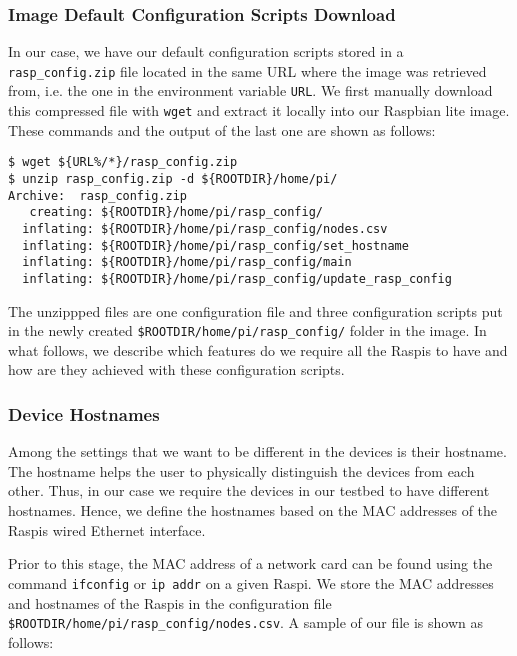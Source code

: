 \subsubsection{Image Default Configuration Scripts Download}
\label{sec:configuration_files_download}
In our case, we have our default configuration scripts stored in a
\texttt{rasp\_config.zip} file located in the same \ac{URL} where the image
was retrieved from, i.e. the one in the environment variable \texttt{URL}.
We first manually download this compressed file with \texttt{wget} and
extract it locally into our Raspbian lite image. These commands and the
output of the last one are shown as follows:

\begin{lstlisting}[]
$ wget ${URL%/*}/rasp_config.zip
$ unzip rasp_config.zip -d ${ROOTDIR}/home/pi/
Archive:  rasp_config.zip
   creating: ${ROOTDIR}/home/pi/rasp_config/
  inflating: ${ROOTDIR}/home/pi/rasp_config/nodes.csv
  inflating: ${ROOTDIR}/home/pi/rasp_config/set_hostname
  inflating: ${ROOTDIR}/home/pi/rasp_config/main
  inflating: ${ROOTDIR}/home/pi/rasp_config/update_rasp_config
\end{lstlisting}
\FloatBarrier
\vspace{-5mm}

The unzippped files are one configuration file and three configuration
scripts put in the newly created \texttt{\${ROOTDIR}/home/pi/rasp\_config/}
folder in the image. In what follows, we describe which features do we
require all the \ac{Raspi}s to have and how are they achieved with
these configuration scripts.

\subsubsection{Device Hostnames}
Among the settings that we want to be different in the devices is
their hostname. The hostname helps the user to physically distinguish the
devices from each other. Thus, in our case we require the devices in our
testbed to have different hostnames. Hence, we define the hostnames based
on the \ac{MAC} addresses of the \ac{Raspi}s wired Ethernet interface.

Prior to this stage, the \ac{MAC} address of a network card can be found
using the command \texttt{ifconfig} or \texttt{ip addr} on a given
\ac{Raspi}. We store the \ac{MAC} addresses and hostnames of the
\ac{Raspi}s in the configuration file
\texttt{\${ROOTDIR}/home/pi/rasp\_config/nodes.csv}. A sample of our file
is shown as follows:

